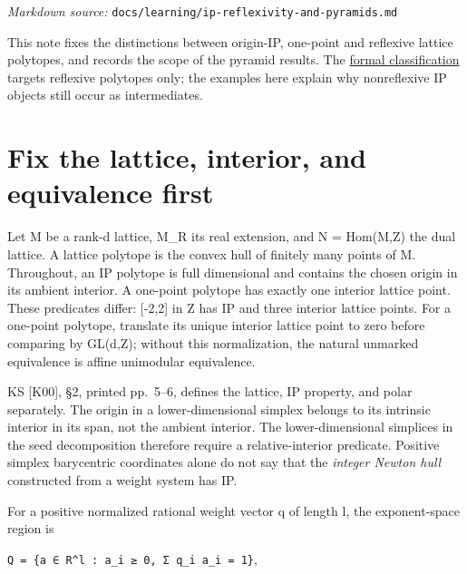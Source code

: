 \documentclass[11pt,a4paper,oneside]{report}
\begin{document}
\noindent\textit{Markdown source: }\texttt{docs/\allowbreak{}learning\allowbreak{}/\allowbreak{}ip-\allowbreak{}reflexiv\allowbreak{}ity-\allowbreak{}and-\allowbreak{}pyramids\allowbreak{}.\allowbreak{}md}

This note fixes the distinctions between origin-IP, one-point and
reflexive lattice polytopes, and records the scope of the pyramid
results. The \href{../../proofs/STATEMENTS.md}{formal classification}
targets reflexive polytopes only; the examples here explain why
nonreflexive IP objects still occur as intermediates.

\section{Fix the lattice, interior, and equivalence
first}\label{ip-reflexivity-and-pyramids--fix-the-lattice-interior-and-equivalence-first}

Let M be a rank-d lattice, M\_R its real extension, and N = Hom(M,Z) the
dual lattice. A lattice polytope is the convex hull of finitely many
points of M. Throughout, an IP polytope is full dimensional and contains
the chosen origin in its ambient interior. A one-point polytope has
exactly one interior lattice point. These predicates differ: {[}-2,2{]}
in Z has IP and three interior lattice points. For a one-point polytope,
translate its unique interior lattice point to zero before comparing by
GL(d,Z); without this normalization, the natural unmarked equivalence is
affine unimodular equivalence.

KS {[}K00{]}, §2, printed pp.~5--6, defines the lattice, IP property,
and polar separately. The origin in a lower-dimensional simplex belongs
to its intrinsic interior in its span, not the ambient interior. The
lower-dimensional simplices in the seed decomposition therefore require
a relative-interior predicate. Positive simplex barycentric coordinates
alone do not say that the \emph{integer Newton hull} constructed from a
weight system has IP.

For a positive normalized rational weight vector q of length l, the
exponent-space region is

\texttt{Q =\allowbreak{} \{a ∈ R\textasciicircum{}l :\allowbreak{} a\_\allowbreak{}i ≥ 0,\allowbreak{} Σ q\_\allowbreak{}i a\_\allowbreak{}i =\allowbreak{} 1\}},
\end{document}
